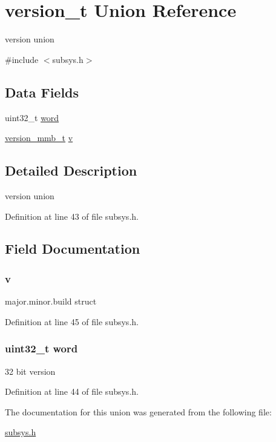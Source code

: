 \hypertarget{unionversion__t}{}\section{version\+\_\+t Union Reference}
\label{unionversion__t}


version union  




{\ttfamily \#include $<$subsys.\+h$>$}

\subsection*{Data Fields}
\begin{DoxyCompactItemize}
\item 
uint32\+\_\+t \hyperlink{unionversion__t_a41a83500045dfb9c4239b2cbf2273a17}{word}
\item 
\hyperlink{structversion__mmb__t}{version\+\_\+mmb\+\_\+t} \hyperlink{unionversion__t_a280a1f68ea29a3776d3d763f92de750f}{v}
\end{DoxyCompactItemize}


\subsection{Detailed Description}
version union 

Definition at line 43 of file subsys.\+h.



\subsection{Field Documentation}
\hypertarget{unionversion__t_a280a1f68ea29a3776d3d763f92de750f}{}
\subsubsection[{v}]{ v}\label{unionversion__t_a280a1f68ea29a3776d3d763f92de750f}
major.\+minor.\+build struct 

Definition at line 45 of file subsys.\+h.

\hypertarget{unionversion__t_a41a83500045dfb9c4239b2cbf2273a17}{}
\subsubsection[{word}]{\setlength{\rightskip}{0pt plus 5cm}uint32\+\_\+t word}\label{unionversion__t_a41a83500045dfb9c4239b2cbf2273a17}
32 bit version 

Definition at line 44 of file subsys.\+h.



The documentation for this union was generated from the following file\+:\begin{DoxyCompactItemize}
\item 
\hyperlink{subsys_8h}{subsys.\+h}\end{DoxyCompactItemize}
